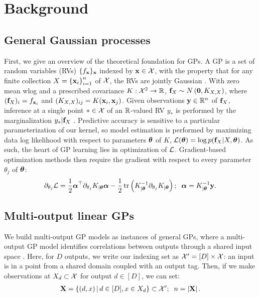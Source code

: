 \documentclass{article}
\begin{document}
\section{Background}
\label{sec:background}

\subsection{General Gaussian processes}

First, we give an overview of the theoretical foundation for GPs. A GP is a set of random variables (RVs) $\{f_{\textbf{x}}\}_{\textbf{x}}$ indexed by $\textbf{x}\in\mathcal{X}$, with the property that for any finite collection $X=\left\{ \textbf{x}_i \right\}_{ i=1 }^{ n }$ of $\mathcal{X}$, the RVs are jointly Gaussian \cite{williams1996gaussian}. With zero mean wlog and a prescribed covariance $K:\mathcal{X}^2\rightarrow\mathbb{R}$, $\textbf{f}_X\sim N\left({\textbf{0}, K_{X, X}}\right)$, where $(\textbf{f}_X)_i=f_{\textbf{x}_i}$ and $(K_{X,X})_{ij}=K(\textbf{x}_i,\textbf{x}_j)$. Given observations $\textbf{y}\in\mathbb{R}^n$ of $\textbf{f}_X$, inference at a single point $*\in\mathcal{X}$ of an $\mathbb{R}$-valued RV $y_*$ is performed by the marginalization $y_*|\textbf{f}_X$ \cite{williams1996gaussian}.
Predictive accuracy is sensitive to a particular parameterization of our kernel, so model estimation is performed by maximizing data log likelihood with respect to parameters ${\boldsymbol\theta}$ of $K$, $\mathcal{L}({\boldsymbol\theta})=\log p(\textbf{f}_{X}|X,{\boldsymbol\theta})$. As such, the heart of GP learning lies in optimization of $\mathcal{L}$. Gradient-based optimization methods then require the gradient with respect to every parameter $\theta_j$ of ${\boldsymbol\theta}$:
\begin{align}
\partial_{\theta_j}\mathcal{L} = \frac{1}{2}{\boldsymbol\alpha}^\top\partial_{\theta_j}K_{|{\boldsymbol\theta}}{\boldsymbol\alpha} -\frac{1}{2}\operatorname{tr}\left({K_{|{\boldsymbol\theta}}^{-1}\partial_{\theta_j}K_{|{\boldsymbol\theta}}}\right);\;\; {\boldsymbol\alpha}=K_{|{\boldsymbol\theta}}^{-1}\textbf{y}.\label{llgradient}
\end{align}

\subsection{Multi-output linear GPs}

We build multi-output GP models as instances of general GPs, where a multi-output GP model identifies correlations between outputs through a shared input space \cite{alvarez2012kernels}. Here, for $D$ outputs, we write our indexing set as $\mathcal{X}'=[D]\times \mathcal{X}$: an input is in a point from a shared domain coupled with an output tag. Then, if we make observations at $X_d\subset\mathcal{X}$ for output $d\in[D]$, we can set:
\begin{align*}
\textbf{X}=\left\{ (d, x) \,\middle|\, d\in[D],x\in X_d \right\}\subset{\mathcal{X}'};\;\; n=\left\vert{\textbf{X}}\right\vert.
\end{align*}
\end{document}
